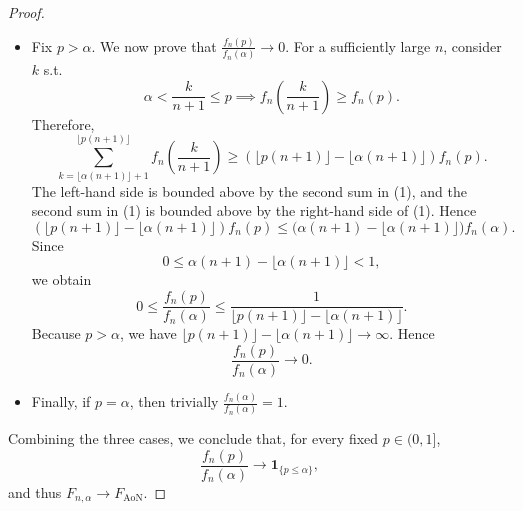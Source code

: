 \documentclass{article}
\theoremstyle{plain}
\theoremstyle{definition}
\theoremstyle{remark}
\begin{document}
\begin{proof}
\begin{itemize}
    \item Fix \(p>\alpha\). We now prove that
    $\frac{f_n(p)}{f_n(\alpha)}\to 0$.
    For a sufficiently large $n$, consider \(k\) s.t. $$\alpha<\frac{k}{n+1}\le p\implies
    f_n\!\left(\frac{k}{n+1}\right)\ge f_n(p).$$
    Therefore,
    \[
    \sum_{k=\lfloor \alpha(n+1)\rfloor+1}^{\lfloor p(n+1)\rfloor}
    f_n\!\left(\frac{k}{n+1}\right)
    \ge
    \left(
    \lfloor p(n+1)\rfloor-\lfloor \alpha(n+1)\rfloor
    \right)f_n(p).
    \]
    The left-hand side is bounded above by the second sum in (1), and the
    second sum in (1) is bounded above by the right-hand side of (1).
    Hence
    \[
    \left(
    \lfloor p(n+1)\rfloor-\lfloor \alpha(n+1)\rfloor
    \right)f_n(p)
    \le
    \bigl(\alpha(n+1)-\lfloor \alpha(n+1)\rfloor\bigr)f_n(\alpha).
    \]
    Since
    \[
    0\le \alpha(n+1)-\lfloor \alpha(n+1)\rfloor<1,
    \]
    we obtain
    \[
    0
    \le
    \frac{f_n(p)}{f_n(\alpha)}
    \le
    \frac{1}{
    \lfloor p(n+1)\rfloor-\lfloor \alpha(n+1)\rfloor
    }.
    \]
    Because \(p>\alpha\), we have
    $\lfloor p(n+1)\rfloor-\lfloor \alpha(n+1)\rfloor\to\infty.$
    Hence
    \[
    \frac{f_n(p)}{f_n(\alpha)}\to 0.
    \]

    \item Finally, if \(p=\alpha\), then trivially
    $\frac{f_n(\alpha)}{f_n(\alpha)}=1$.
\end{itemize}

Combining the three cases, we conclude that, for every fixed \(p\in(0,1]\),
\[
\frac{f_n(p)}{f_n(\alpha)}
\longrightarrow
\mathbf 1_{\{p\le \alpha\}},
\]
and thus $F_{n,\alpha}\to F_{\mathrm{AoN}}.$
\end{proof}




\end{document}
